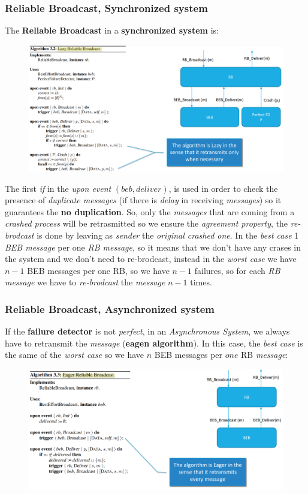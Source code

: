\documentclass{article}
\begin{document}
\subsubsection{Reliable Broadcast, Synchronized system}
The \textbf{Reliable Broadcast} in a \textbf{synchronized system} is:
\begin{figure}[H]
  \centering
  \includegraphics[scale=0.8,left]{cattura34.png}
\end{figure}
The first \emph{if} in the \emph{upon event} $(beb, deliver)$, is used in order to check the presence of \emph{duplicate messages} (if there is \emph{delay} in receiving \emph{messages}) so it guarantees the \textbf{no duplication}. So, only the \emph{messages} that are coming from a \emph{crashed process} will be retrasmitted so we ensure the \emph{agreement property}, the \emph{re-brodcast} is done by leaving as \emph{sender} the \emph{original crashed one}. In the \emph{best case} 1 \emph{BEB message} per one \emph{RB message}, so it means that we don't have any crases in the system and we don't need to re-brodcast, instead in the \emph{worst case} we have $n-1$ BEB messages per one RB, so we have $n-1$ failures, so for each \emph{RB message} we have to \emph{re-brodcast} the \emph{message} $n-1$ times. 
\subsubsection{Reliable Broadcast, Asynchronized system}
If the \textbf{failure detector} is not \emph{perfect}, in an \emph{Asynchronous System}, we always have to retransmit the \emph{message} (\textbf{eagen algorithm}). In this case, the \emph{best case} is the same of the \emph{worst case} so we have $n$ BEB messages per $one$ RB \emph{message}:
\begin{figure}[H]
  \centering
  \includegraphics[scale=0.65,left]{cattura35.png}
\end{figure}
\end{document}
